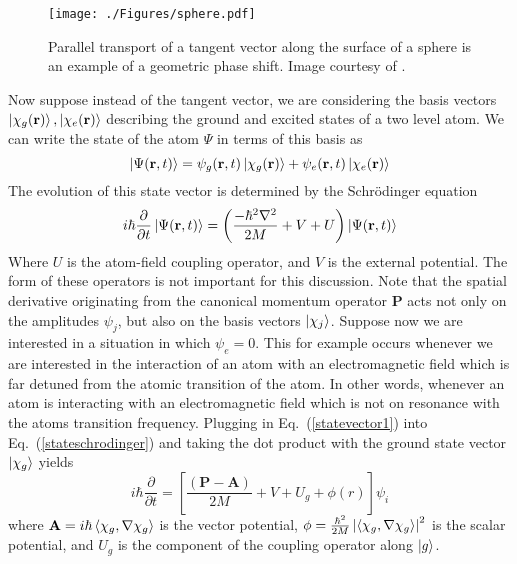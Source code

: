 \begin{figure}[htp]
\centering
\texttt{[image: ./Figures/sphere.pdf]}
\caption{Parallel transport of a tangent vector along the surface of a sphere is an example of a geometric phase shift. Image courtesy of \cite{sphere}.} 
\label{fig:sphere}
\end{figure}

Now suppose instead of the tangent vector, we are considering the basis vectors ${\ket{\chi_g(\mathbf{r})},\ket{\chi_e(\mathbf{r})}} $ describing the ground and excited states of a two level atom. We can write the state of the atom $\Psi$ in terms of this basis as
\begin{equation}
\ket{\Psi(\mathbf{r},t)}=\psi_g(\mathbf{r},t)\ket{\chi_g(\mathbf{r})}+\psi_e(\mathbf{r},t)\ket{\chi_e(\mathbf{r})}
\label{statevector1}
\end{equation}
The evolution of this state vector is determined by the Schr\"{o}dinger equation
\begin{equation}
i\hbar\frac{\partial}{\partial t}\ket{\Psi(\mathbf{r},t)}=\left(\frac{-\hbar^2\nabla^2}{2M}+V+U\right)\ket{\Psi(\mathbf{r},t)}
\label{stateschrodinger}
\end{equation}
Where $U$ is the atom-field coupling operator, and $V$ is the external potential. The form of these operators is not important for this discussion. Note that the spatial derivative originating from the canonical momentum operator $\mathbf{P}$ acts not only on the amplitudes $\psi_j$, but also on the basis vectors $\ket{\chi_j}$. Suppose now we are interested in a situation in which $\psi_e=0$. This for example occurs whenever we are interested in the interaction of an atom with an electromagnetic field which is far detuned from the atomic transition of the atom.  In other words, whenever an atom is interacting with an electromagnetic field which is not on resonance with the atoms transition frequency. Plugging in Eq.\ (\ref{statevector1}) into Eq.\ (\ref{stateschrodinger}) and taking the dot product with the ground state vector $\ket{\chi_g}$ yields
\begin{equation}
i\hbar\frac{\partial}{\partial t}=\left[\frac{\left(\mathbf{P}-\mathbf{A}\right)}{2M}+V+U_{g}+\phi(r)\right]\psi_i
\end{equation}
where $\mathbf{A}=i\hbar\braket{\chi_g,\nabla \chi_g}$ is the vector potential, $\phi=\frac{\hbar^2}{2M}\left|\braket{\chi_g,\nabla \chi_g}\right|^2$
is the scalar potential, and $U_g$ is the component of the coupling operator along $\ket{g}$. 

